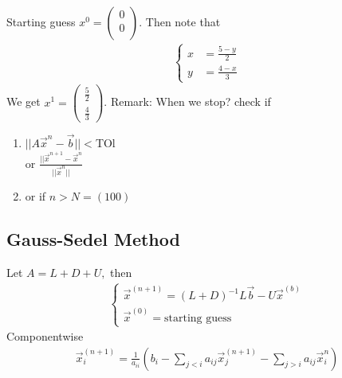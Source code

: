 \documentclass[11pt,oneside]{book}
\theoremstyle{break}
\theoremstyle{break}
\newcommand{\remark}{\color{blue}Remark: \color{black}}
\begin{document}
Starting guess $x^0= \begin{pmatrix}
0\\
0\\
\end{pmatrix}
$. Then note that \begin{align*}
\begin{cases}
x&=\frac{5-y}{2}\\
y&=\frac{4-x}{3}
\end{cases}
\end{align*}
We get $x^1=\begin{pmatrix}
\frac{5}{2}\\
\frac{4}{3}
\end{pmatrix}$. 
\remark When we stop? check if \begin{enumerate}
\item $||A\vec{x}^n -\vec{b}||<$TOl\\
or $\frac{||\vec{x}^{n+1}-\vec{x}^{n}}{||\vec{x}^n||}$
\item or if $n>N=(100)$
\end{enumerate}
\subsection[Gauss-Sedel Method]{Gauss-Sedel Method}
Let $A=L+D+U,$ then \begin{align*}
\begin{cases}
\vec{x}^{(n+1)}=(L+D)^{-1}L\vec{b}-U\vec{x}^{(b)}
\\
\vec{x}^{(0)}=\text{starting guess}
\end{cases}
\end{align*}
Componentwise \begin{align*}
\vec{x}_{i}^{(n+1)}=\frac{1}{a_{ii}}\left(b_i-\sum_{j<i}a_{ij}\vec{x}_j^{(n+1)}-\sum_{j>i}a_{ij}\vec{x}_i^{n} \right)
\end{align*}
\end{document}
